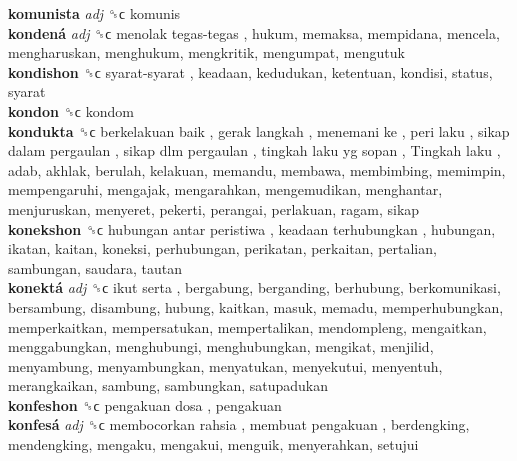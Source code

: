 \textbf{komunista} \emph{adj}  ␝ϲ  komunis  \\
\textbf{kondená} \emph{adj}  ␝ϲ   menolak tegas-tegas , hukum, memaksa, mempidana, mencela, mengharuskan, menghukum, mengkritik, mengumpat, mengutuk  \\
\textbf{kondishon} ␝ϲ   syarat-syarat , keadaan, kedudukan, ketentuan, kondisi, status, syarat  \\
\textbf{kondon} ␝ϲ  kondom  \\
\textbf{kondukta} ␝ϲ   berkelakuan baik ,  gerak langkah ,  menemani ke ,  peri laku ,  sikap dalam pergaulan ,  sikap dlm pergaulan ,  tingkah laku yg sopan ,  Tingkah laku , adab, akhlak, berulah, kelakuan, memandu, membawa, membimbing, memimpin, mempengaruhi, mengajak, mengarahkan, mengemudikan, menghantar, menjuruskan, menyeret, pekerti, perangai, perlakuan, ragam, sikap  \\
\textbf{konekshon} ␝ϲ   hubungan antar peristiwa ,  keadaan terhubungkan , hubungan, ikatan, kaitan, koneksi, perhubungan, perikatan, perkaitan, pertalian, sambungan, saudara, tautan  \\
\textbf{konektá} \emph{adj}  ␝ϲ   ikut serta , bergabung, berganding, berhubung, berkomunikasi, bersambung, disambung, hubung, kaitkan, masuk, memadu, memperhubungkan, memperkaitkan, mempersatukan, mempertalikan, mendompleng, mengaitkan, menggabungkan, menghubungi, menghubungkan, mengikat, menjilid, menyambung, menyambungkan, menyatukan, menyekutui, menyentuh, merangkaikan, sambung, sambungkan, satupadukan  \\
\textbf{konfeshon} ␝ϲ   pengakuan dosa , pengakuan  \\
\textbf{konfesá} \emph{adj}  ␝ϲ   membocorkan rahsia ,  membuat pengakuan , berdengking, mendengking, mengaku, mengakui, menguik, menyerahkan, setujui  \\
